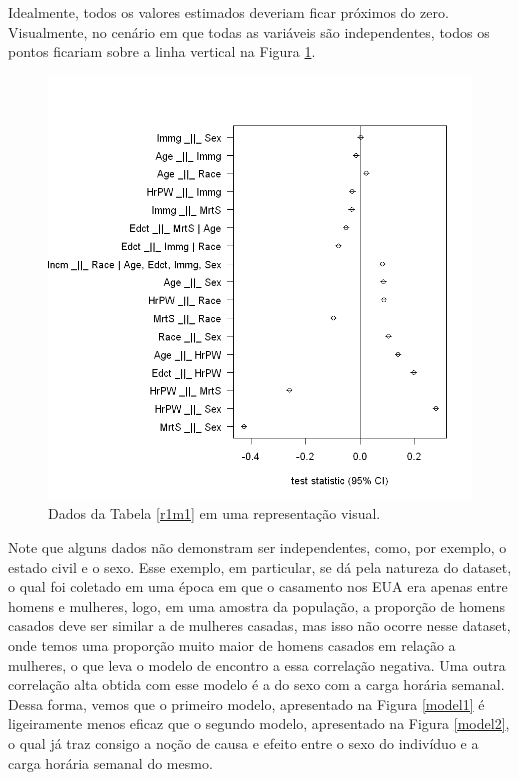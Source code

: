 \documentclass[11pt,letterpaper,twocolumn]{article}
\begin{document}
Idealmente, todos os valores estimados deveriam ficar próximos do zero. Visualmente, no cenário em que todas as variáveis são independentes, todos os pontos ficariam sobre a linha vertical na Figura \ref{r1m1f}.
\begin{figure}
    \centering
    \includegraphics[scale = 0.5]{A2/Imagens/r1m1.png}
    \caption{Dados da Tabela \ref{r1m1} em uma representação visual.}
    \label{r1m1f}
\end{figure}

Note que alguns dados não demonstram ser independentes, como, por exemplo, o estado civil e o sexo. Esse exemplo, em particular, se dá pela natureza do dataset, o qual foi coletado em uma época em que o casamento nos EUA era apenas entre homens e mulheres, logo, em uma amostra da população, a proporção de homens casados deve ser similar a de mulheres casadas, mas isso não ocorre nesse dataset, onde temos uma proporção muito maior de homens casados em relação a mulheres, o que leva o modelo de encontro a essa correlação negativa. Uma outra correlação alta obtida com esse modelo é a do sexo com a carga horária semanal. Dessa forma, vemos que o primeiro modelo, apresentado na Figura \ref{model1} é ligeiramente menos eficaz que o segundo modelo, apresentado na Figura \ref{model2}, o qual já traz consigo a noção de causa e efeito entre o sexo do indivíduo e a carga horária semanal do mesmo.
\end{document}
